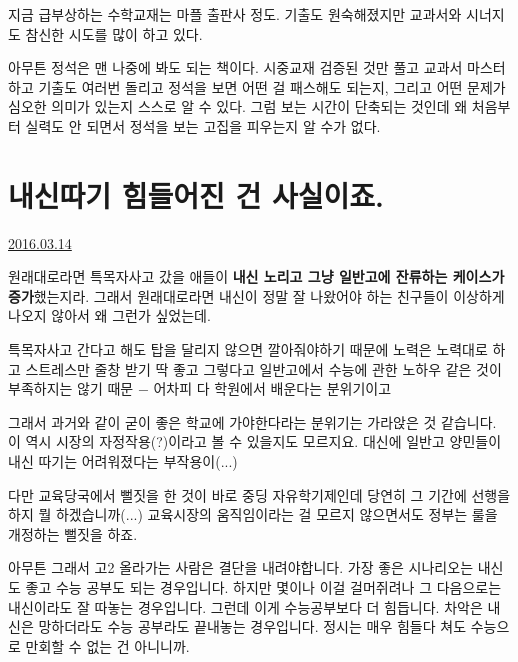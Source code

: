 지금 급부상하는 수학교재는 마플 출판사 정도. 기출도 원숙해졌지만 교과서와 시너지도 참신한 시도를 많이 하고 있다.
\vspace{5mm}

아무튼 정석은 맨 나중에 봐도 되는 책이다.
시중교재 검증된 것만 풀고 교과서 마스터하고 기출도 여러번 돌리고 정석을 보면
어떤 걸 패스해도 되는지, 그리고 어떤 문제가 심오한 의미가 있는지 스스로 알 수 있다.
그럼 보는 시간이 단축되는 것인데 왜 처음부터 실력도 안 되면서 정석을 보는 고집을 피우는지 알 수가 없다.
\vspace{5mm}









\section{내신따기 힘들어진 건 사실이죠.}
\href{https://www.kockoc.com/Apoc/675938}{2016.03.14}

\vspace{5mm}

원래대로라면 특목자사고 갔을 애들이 \textbf{내신 노리고 그냥 일반고에 잔류하는 케이스가 증가}했는지라.
그래서 원래대로라면 내신이 정말 잘 나왔어야 하는 친구들이 이상하게 나오지 않아서 왜 그런가 싶었는데.
\vspace{5mm}

특목자사고 간다고 해도 탑을 달리지 않으면 깔아줘야하기 때문에 노력은 노력대로 하고 스트레스만 줄창 받기 딱 좋고
그렇다고 일반고에서 수능에 관한 노하우 같은 것이 부족하지는 않기 때문 $-$ 어차피 다 학원에서 배운다는 분위기이고
\vspace{5mm}

그래서 과거와 같이 굳이 좋은 학교에 가야한다라는 분위기는 가라앉은 것 같습니다.
이 역시 시장의 자정작용(?)이라고 볼 수 있을지도 모르지요.  대신에 일반고 양민들이 내신 따기는 어려워졌다는 부작용이(...)
\vspace{5mm}

다만 교육당국에서 뻘짓을 한 것이 바로 중딩 자유학기제인데 당연히 그 기간에 선행을 하지 뭘 하겠습니까(...)
교육시장의 움직임이라는 걸 모르지 않으면서도 정부는 룰을 개정하는 뻘짓을 하죠.
\vspace{5mm}

아무튼 그래서 고2 올라가는 사람은 결단을 내려야합니다.
가장 좋은 시나리오는 내신도 좋고 수능 공부도 되는 경우입니다. 하지만 몇이나 이걸 걸머쥐려나
그 다음으로는 내신이라도 잘 따놓는 경우입니다. 그런데 이게 수능공부보다 더 힘듭니다.
차악은 내신은 망하더라도 수능 공부라도 끝내놓는 경우입니다. 정시는 매우 힘들다 쳐도 수능으로 만회할 수 없는 건 아니니까.
\vspace{5mm}

